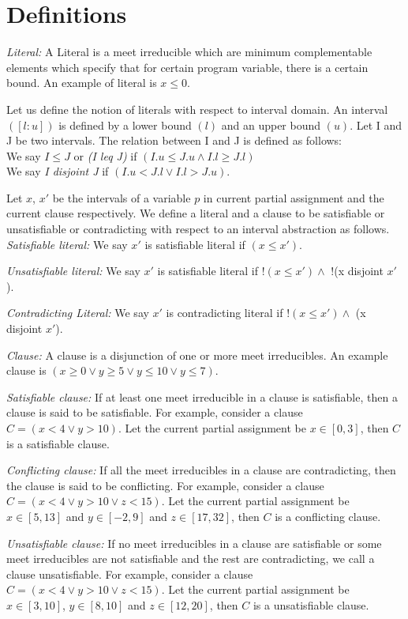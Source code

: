 \section{Definitions}\label{definition}
%
\textit{Literal:} A Literal is a meet irreducible which are minimum complementable
elements which specify that for certain program variable, there is a certain
bound. An example of literal is $x \leq 0$.

Let us define the notion of literals with respect to interval domain. 
An interval $([l:u])$ is defined by a lower bound $(l)$ and an upper bound $(u)$.
Let I and J be two intervals. The relation between I and J is defined as follows:\\
We say $I \leq J$ or {\em (I leq J)} if $(I.u \leq J.u \wedge I.l \geq J.l)$\\
We say {\em I disjoint J} if $(I.u < J.l \vee  I.l > J.u)$.

Let $x$, $x'$ be the intervals of a variable $p$ in current 
partial assignment and the current clause respectively. 
We define a literal and a clause to be satisfiable or unsatisfiable 
or contradicting with respect to an interval abstraction as follows. \\
\textit{Satisfiable literal:} 
We say $x'$ is satisfiable literal if $(x \leq x')$.

\textit{Unsatisfiable literal:}
We say $x'$ is satisfiable literal if $!(x \leq x') \wedge$ $!$(x disjoint $x'$).

\textit{Contradicting Literal:}
We say $x'$ is contradicting literal if $!(x \leq x') \wedge$ (x disjoint $x'$).

\textit{Clause:} A clause is a disjunction of one or more meet irreducibles. An 
example clause is $(x \geq 0 \vee y \geq 5 \vee y \leq 10 \vee y \leq 7)$.

\textit{Satisfiable clause:}
If at least one meet irreducible in a clause is satisfiable, then a clause is said to 
be satisfiable. For example, consider a clause $C=(x<4 \vee y>10)$. Let the 
current partial assignment be $x \in [0,3]$, then $C$ is a satisfiable clause. 

\textit{Conflicting clause:}
If all the meet irreducibles in a clause are contradicting, then the clause is said to
be conflicting. For example, consider a clause $C=(x<4 \vee y>10 \vee z<15)$. Let the 
current partial assignment be $x \in [5,13]$ and $y \in [-2,9]$ and $z \in
[17,32]$, then $C$ is a conflicting clause.

\textit{Unsatisfiable clause:}
If no meet irreducibles in a clause are satisfiable or some meet
irreducibles are not satisfiable and the rest are contradicting, we call a 
clause unsatisfiable. For example, consider a clause $C=(x<4 \vee y>10 \vee z<15)$. 
Let the current partial assignment be $x \in [3,10]$, $y \in [8,10]$ and $z \in [12,20]$, 
then $C$ is a unsatisfiable clause. 

